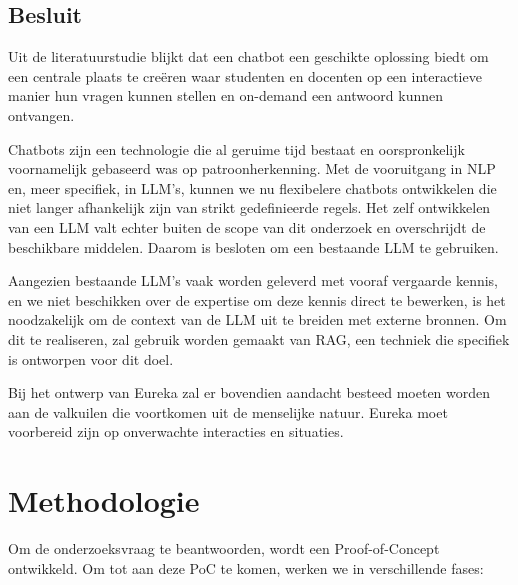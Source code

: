 \subsection{Besluit}

Uit de literatuurstudie blijkt dat een chatbot een geschikte oplossing biedt om een centrale plaats te creëren waar studenten en docenten op een interactieve manier hun vragen kunnen stellen en on-demand een antwoord kunnen ontvangen.

Chatbots zijn een technologie die al geruime tijd bestaat en oorspronkelijk voornamelijk gebaseerd was op patroonherkenning. Met de vooruitgang in NLP en, meer specifiek, in LLM's, kunnen we nu flexibelere chatbots ontwikkelen die niet langer afhankelijk zijn van strikt gedefinieerde regels. Het zelf ontwikkelen van een LLM valt echter buiten de scope van dit onderzoek en overschrijdt de beschikbare middelen. Daarom is besloten om een bestaande LLM te gebruiken.

Aangezien bestaande LLM's vaak worden geleverd met vooraf vergaarde kennis, en we niet beschikken over de expertise om deze kennis direct te bewerken, is het noodzakelijk om de context van de LLM uit te breiden met externe bronnen. Om dit te realiseren, zal gebruik worden gemaakt van RAG, een techniek die specifiek is ontworpen voor dit doel.

Bij het ontwerp van Eureka zal er bovendien aandacht besteed moeten worden aan de valkuilen die voortkomen uit de menselijke natuur. Eureka moet voorbereid zijn op onverwachte interacties en situaties.

\section{Methodologie}%
\label{sec:methodologie}

Om de onderzoeksvraag te beantwoorden, wordt een Proof-of-Concept ontwikkeld. Om tot aan deze PoC te komen, werken we in verschillende fases:

